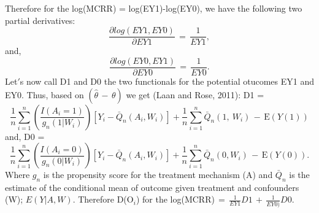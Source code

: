 \documentclass[]{article}
\newenvironment{Shaded}{\begin{snugshade}}{\end{snugshade}}
\newcommand{\CommentTok}[1]{\textcolor[rgb]{0.56,0.35,0.01}{\textit{#1}}}
\newcommand{\DecValTok}[1]{\textcolor[rgb]{0.00,0.00,0.81}{#1}}
\newcommand{\FloatTok}[1]{\textcolor[rgb]{0.00,0.00,0.81}{#1}}
\newcommand{\KeywordTok}[1]{\textcolor[rgb]{0.13,0.29,0.53}{\textbf{#1}}}
\newcommand{\NormalTok}[1]{#1}
\newcommand{\OperatorTok}[1]{\textcolor[rgb]{0.81,0.36,0.00}{\textbf{#1}}}
\newcommand{\StringTok}[1]{\textcolor[rgb]{0.31,0.60,0.02}{#1}}
\begin{document}
Therefore for the log(MCRR) = log(EY1)-log(EY0), we have the following
two partial derivatives:
\[\frac{\partial log(EY1,EY0)}{\partial EY1}\,=\, \frac{1}{EY1}, \] and,
\[\frac{\partial log(EY0,EY1)}{\partial EY0}\,=\, \frac{1}{EY0}. \]
Let\('\)s now call D1 and D0 the two functionals for the potential
otucomes EY1 and EY0. Thus, based on \((\hat\theta\,-\,\theta)\) we get
(Laan and Rose, 2011): D1 =
\[\frac{1}{n}\sum_{i=1}^{n}\left(\frac{I\left(A_{i}=1\right)}{g_n(1|W_{i})}\right)\left[Y_{i}-\bar{Q}_{n}\left(A_{i},W_{i}\right)\right]+\frac{1}{n}\sum_{i=1}^{n}\bar{Q}_{n}\left(1,\ W_{i}\right)\,-\,\text{E}(Y(1))\]
and, D0 =
\[\frac{1}{n}\sum_{i=1}^{n}\left(\frac{I\left(A_{i}=0\right)}{g_n(0|W_{i})}\right)\left[Y_{i}-\bar{Q}_{n}\left(A_{i},W_{i}\right)\right]+\frac{1}{n}\sum_{i=1}^{n}\bar{Q}_{n}\left(0,W_{i}\right)\,-\, \text{E}(Y(0)).\]
Where \(g_{n}\) is the propensity score for the treatment mechanism (A)
and \(\bar Q_{n}\) is the estimate of the conditional mean of outcome
given treatment and confounders (W); \(E(Y|A,W)\). Therefore
D(\(\text{O}_{i}\)) for the
log(MCRR)\(\,=\,\frac{1}{EY1}D1\,+\,\frac{1}{EY0)}D0.\)

\begin{Shaded}
\end{Shaded}
\end{document}
